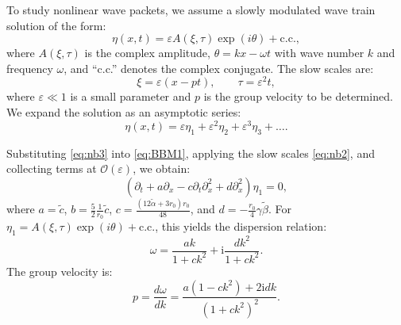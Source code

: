 \documentclass[alpha-refs, 12pt]{wiley-article}
\renewcommand{\O}{\mathcal{O}}
\newcommand{\ui}{\mathrm{i}}
\newcommand{\eps}{\varepsilon}
\begin{document}
To study nonlinear wave packets, we assume a slowly modulated wave train solution of the form:
\begin{equation}\label{eq:nb1}
  \eta(x,t) = \eps A(\xi, \tau) \exp(i \theta) + \text{c.c.},
\end{equation}
where $A(\xi, \tau)$ is the complex amplitude, $\theta = k x - \omega t$ with wave number $k$ and frequency $\omega$, and ``c.c.'' denotes the complex conjugate. The slow scales are:
\begin{equation}\label{eq:nb2}
  \xi = \eps (x - p t), \qquad \tau = \eps^2 t,
\end{equation}
where $\eps \ll 1$ is a small parameter and $p$ is the group velocity to be determined. We expand the solution as an asymptotic series:
\begin{equation}\label{eq:nb3}
  \eta(x,t) = \eps \eta_1 + \eps^2 \eta_2 + \eps^3 \eta_3 + \dots.
\end{equation}

Substituting \eqref{eq:nb3} into \eqref{eq:BBM1}, applying the slow scales \eqref{eq:nb2}, and collecting terms at $\O(\eps)$, we obtain:
\begin{equation}\label{eq:first_order}
  \left(\partial_t + a \partial_x - c \partial_t \partial_x^2 + d \partial_x^2 \right)\eta_1 = 0,
\end{equation}
where $a = \tilde{c}$, $b = \frac{5}{2} \frac{1}{r_0} \tilde{c}$, $c = \frac{(12 \tilde{\alpha} + 3 r_0) r_0}{48}$, and $d = -\frac{r_0}{4} \gamma \tilde{\beta}$. For $\eta_1 = A(\xi, \tau) \exp(i \theta) + \text{c.c.}$, this yields the dispersion relation:
\begin{equation}\label{eq:dispersion_bbm}
  \omega = \frac{a k}{1 + c k^2} + \ui \frac{d k^2}{1 + c k^2}.
\end{equation}
The group velocity is:
\[
  p = \frac{d \omega}{d k} = \frac{a (1 - c k^2) + 2 \ui d k}{(1 + c k^2)^2}.
\]
\end{document}

